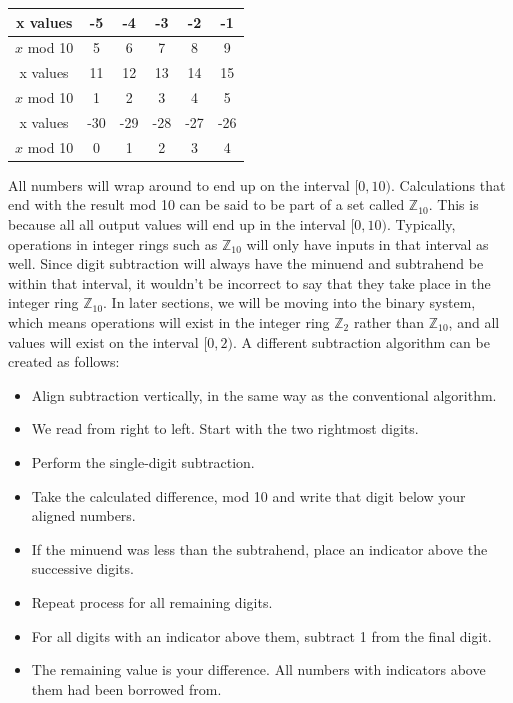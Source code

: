 \documentclass[oneside]{book}
\begin{document}
\begin{center}
\begin{tabular}{|c|c|c|c|c|c|}
\hline
x values & -5 & -4 & -3 & -2 & -1 \\
\hline
$x$ mod 10 & 5 & 6 & 7 & 8 & 9\\
\hline
x values & 11 & 12 & 13 & 14 & 15\\
\hline
$x$ mod 10 & 1 & 2 & 3 & 4 & 5\\
\hline
x values & -30 & -29 & -28 & -27 & -26 \\
\hline
$x$ mod 10 & 0 & 1 & 2 & 3 & 4 \\
\hline 
\end{tabular}
\end{center}
\tab
All numbers will wrap around to end up on the interval $[0,10)$. Calculations that end with the result mod 10 can be said to be part of a set called $\mathbb{Z}_{10}$. This is because all all output values will end up in the interval $[0,10)$. Typically, operations in integer rings such as $\mathbb{Z}_{10}$ will only have inputs in that interval as well. Since digit subtraction will always have the minuend and subtrahend be within that interval, it wouldn't be incorrect to say that they take place in the integer ring $\mathbb{Z}_{10}$. In later sections, we will be moving into the binary system, which means operations will exist in the integer ring $\mathbb{Z}_2$ rather than $\mathbb{Z}_{10}$, and all values will exist on the interval $[0,2)$. 
\newline
\tab
A different subtraction algorithm can be created as follows:
\begin{itemize}
	\item Align subtraction vertically, in the same way as the conventional algorithm.
	\item We read from right to left. Start with the two rightmost digits.
	\item Perform the single-digit subtraction.
	\item Take the calculated difference, mod 10 and write that digit below your aligned numbers.
	\item If the minuend was less than the subtrahend, place an indicator above the successive digits.
	\item Repeat process for all remaining digits.
	\item For all digits with an indicator above them, subtract 1 from the final digit.
	\item The remaining value is your difference. All numbers with indicators above them had been borrowed from.
\end{itemize}
\end{document}
